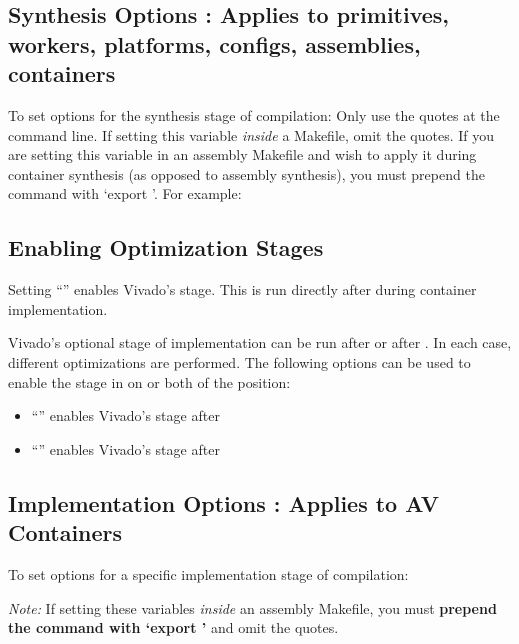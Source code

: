 \begin{flushleft}
\subsection{Synthesis Options : Applies to primitives, workers, platforms, configs, assemblies, containers}
\label{synth-opt}
To set options for the synthesis stage of compilation:\newline
{}\newline
Only use the quotes at the command line. If setting this variable \textit{inside} a Makefile, omit the quotes. If you are setting this variable in an assembly Makefile and wish to apply it during container synthesis (as opposed to assembly synthesis), you must prepend the command with `export '. For example:\newline
{}\newline

\subsection{Enabling Optimization Stages}
Setting ``'' enables Vivado's  stage. This is run directly after  during container implementation.\newline

Vivado's optional  stage of implementation can be run after  or after . In each case, different optimizations are performed. The following options can be used to enable the  stage in on or both of the position:\newline
\begin{itemize}
\item ``'' enables Vivado's  stage after 
\item ``'' enables Vivado's  stage after 
\end{itemize}

\subsection{Implementation Options : Applies to AV Containers}
To set options for a specific implementation stage of compilation:\newline
{}\newline
{\footnotesize \textit{Note:} If setting these variables \textit{inside} an assembly Makefile, you must \textbf{prepend the command with `export '} and omit the quotes.\par}


\end{flushleft}
